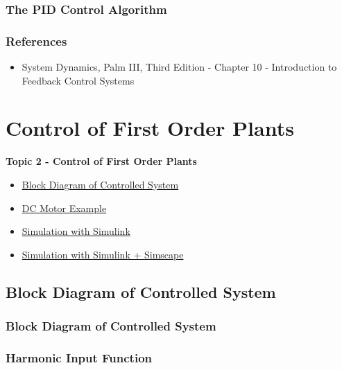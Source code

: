 \documentclass[fleqn]{beamer} %
\newcommand{\sectionIItitle}{Control of First Order Plants}
\newcommand{\sectionIsubsectionIVtitle}{The PID Control Algorithm}
\newcommand{\sectionIIsubsectionItitle}{Block Diagram of Controlled System}
\newcommand{\sectionIIsubsectionIItitle}{DC Motor Example}
\newcommand{\sectionIIsubsectionIIItitle}{Simulation with Simulink}
\newcommand{\sectionIIsubsectionIVtitle}{Simulation with Simulink + Simscape}
\begin{document}
			\begin{frame}
				\frametitle{\sectionIsubsectionIVtitle}
				\bigskip

				\frametitle{References}

				\begin{itemize}
					\item System Dynamics, Palm III, Third Edition - Chapter 10 - Introduction to Feedback Control Systems
				\end{itemize}
			
				\btVFill
			\end{frame}
	
	\section{\sectionIItitle}\label{sectionII}

		\begin{frame}
			\large \textbf{Topic 2 - \sectionIItitle} \vspace{3mm}\\

			\begin{itemize}
				\item \hyperlink{sectionIIsubsectionI}{\sectionIIsubsectionItitle} \vspc %
				\item \hyperlink{sectionIIsubsectionII}{\sectionIIsubsectionIItitle} \vspc %
				\item \hyperlink{sectionIIsubsectionIII}{\sectionIIsubsectionIIItitle} \vspc %
				\item \hyperlink{sectionIIsubsectionIV}{\sectionIIsubsectionIVtitle} \vspc %
			\end{itemize}

		\end{frame}

		\subsection{\sectionIIsubsectionItitle}\label{sectionIIsubsectionI}

			\begin{frame}[label=sectionIIsubsectionI]
				\frametitle{\sectionIIsubsectionItitle}
				\bigskip

				\frametitle{Harmonic Input Function}
				
				\btVFill
			\end{frame}
\end{document}
